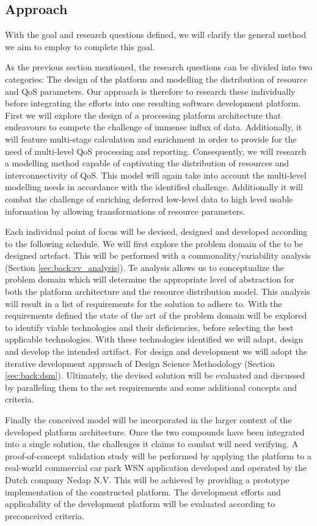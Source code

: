 \subsection{Approach}
With the goal and research questions defined, we will clarify the general method we aim to employ to complete this goal.

As the previous section mentioned, the research questions can be divided into two categories: The design of the platform and modelling the distribution of resource and QoS parameters. Our approach is therefore to research these individually before integrating the efforts into one resulting software development platform. First we will explore the design of a processing platform architecture that endeavours to compete the challenge of immense influx of data. Additionally, it will feature multi-stage calculation and enrichment in order to provide for the need of multi-level QoS processing and reporting. Consequently, we will research a modelling method capable of captivating the distribution of resources and interconnectivity of QoS. This model will again take into account the multi-level modelling needs in accordance with the identified challenge. Additionally it will combat the challenge of enriching deferred low-level data to high level usable information by allowing transformations of resource parameters. 

Each individual point of focus will be devised, designed and developed according to the following schedule. We will first explore the problem domain of the to be designed artefact. This will be performed with a commonality/variability analysis (Section \ref{sec:back:cv_analysis}). Te analysis allows us to conceptualize the problem domain which will determine the appropriate level of abstraction for both the platform architecture and the resource distribution model. This analysis will result in a list of requirements for the solution to adhere to. With the requirements defined the state of the art of the problem domain will be explored to identify viable technologies and their deficiencies, before selecting the best applicable technologies. With these technologies identified we will adapt, design and develop the intended artifact. For design and development we will adopt the iterative development approach of Design Science Methodology\cite{dsm} (Section \ref{sec:back:dsm}). Ultimately, the devised solution will be evaluated and discussed by paralleling them to the set requirements and some additional concepts and criteria. 

Finally the conceived model will be incorporated in the larger context of the developed platform architecture. Once the two compounds have been integrated into a single solution, the challenges it claims to combat will need verifying. A proof-of-concept validation study will be performed by applying the platform to a real-world commercial car park WSN application developed and operated by the Dutch company Nedap N.V. This will be achieved by providing a prototype implementation of the constructed platform. The development efforts and applicability of the development platform will be evaluated according to preconceived criteria.

